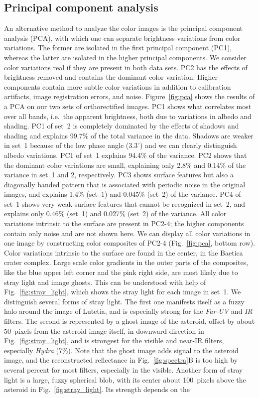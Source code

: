 \documentclass[3p,authoryear]{elsarticle}
\begin{document}
\subsection{Principal component analysis}
\label{sec:pca}

An alternative method to analyze the color images is the principal component analysis (PCA), with which one can separate brightness variations from color variations. The former are isolated in the first principal component (PC1), whereas the latter are isolated in the higher principal components. We consider color variations real if they are present in both data sets. PC2 has the effects of brightness removed and contains the dominant color variation. Higher components contain more subtle color variations in addition to calibration artifacts, image registration errors, and noise. Figure~\ref{fig:pca} shows the results of a PCA on our two sets of orthorectified images. PC1 shows what correlates most over all bands, i.e.\ the apparent brightness, both due to variations in albedo and shading. PC1 of set~2 is completely dominated by the effects of shadows and shading and explains 99.7\% of the total variance in the data. Shadows are weaker in set~1 because of the low phase angle ($3.3^\circ$) and we can clearly distinguish albedo variations. PC1 of set~1 explains 94.4\% of the variance. PC2 shows that the dominant color variations are small, explaining only 2.8\% and 0.14\% of the variance in set~1 and 2, respectively. PC3 shows surface features but also a diagonally banded pattern that is associated with periodic noise in the original images, and explains 1.4\% (set~1) and 0.045\% (set~2) of the variance. PC4 of set~1 shows very weak surface features that cannot be recognized in set~2, and explains only 0.46\% (set~1) and 0.027\% (set~2) of the variance. All color variations intrinsic to the surface are present in PC2-4; the higher components contain only noise and are not shown here. We can display all color variations in one image by constructing color composites of PC2-4 (Fig.~\ref{fig:pca}, bottom row). Color variations intrinsic to the surface are found in the center, in the Baetica crater complex. Large scale color gradients in the outer parts of the composites, like the blue upper left corner and the pink right side, are most likely due to stray light and image ghosts. This can be understood with help of Fig.~\ref{fig:stray_light}, which shows the stray light for each image in set~1. We distinguish several forms of stray light. The first one manifests itself as a fuzzy halo around the image of Lutetia, and is especially strong for the {\it Far-UV} and {\it IR} filters. The second is represented by a ghost image of the asteroid, offset by about 50~pixels from the asteroid image itself, in downward direction in Fig.~\ref{fig:stray_light}, and is strongest for the visible and near-IR filters, especially {\it Hydra} (7\%). Note that the ghost image adds signal to the asteroid image, and the reconstructed reflectance in Fig.~\ref{fig:spectra}B is too high by several percent for most filters, especially in the visible. Another form of stray light is a large, fuzzy spherical blob, with its center about 100~pixels above the asteroid in Fig.~\ref{fig:stray_light}. Its strength depends on the 
\end{document}

